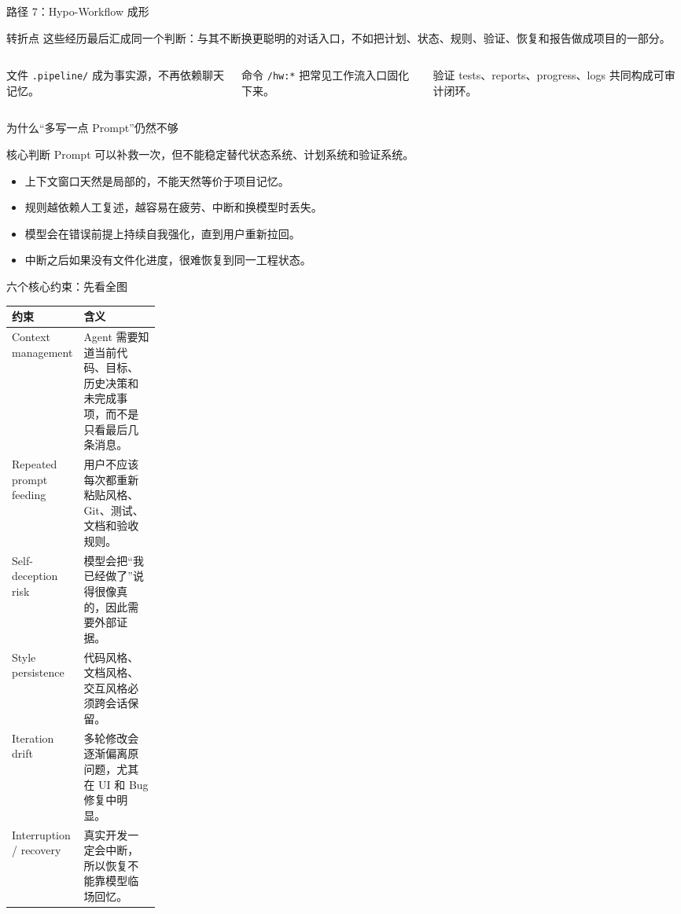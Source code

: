\documentclass[theme=workflow,aspectratio=169,fontset=tech]{Hypo-Slide}
\begin{document}
\begin{frame}{路径 7：Hypo-Workflow 成形}
  \begin{block}{转折点}
    这些经历最后汇成同一个判断：与其不断换更聪明的对话入口，不如把计划、状态、规则、验证、恢复和报告做成项目的一部分。
  \end{block}
  \begin{columns}[T,totalwidth=\textwidth]
    \begin{block}{文件}
      \texttt{.pipeline/} 成为事实源，不再依赖聊天记忆。
    \end{block}
    \begin{block}{命令}
      \texttt{/hw:*} 把常见工作流入口固化下来。
    \end{block}
    \begin{block}{验证}
      tests、reports、progress、logs 共同构成可审计闭环。
    \end{block}
  \end{columns}
\end{frame}

\begin{frame}{为什么“多写一点 Prompt”仍然不够}
  \begin{block}{核心判断}
    Prompt 可以补救一次，但不能稳定替代状态系统、计划系统和验证系统。
  \end{block}
  \begin{itemize}
    \item 上下文窗口天然是局部的，不能天然等价于项目记忆。
    \item 规则越依赖人工复述，越容易在疲劳、中断和换模型时丢失。
    \item 模型会在错误前提上持续自我强化，直到用户重新拉回。
    \item 中断之后如果没有文件化进度，很难恢复到同一工程状态。
  \end{itemize}
\end{frame}

\begin{frame}{六个核心约束：先看全图}
  \small
  \begin{tabularx}{\textwidth}{p{0.22\linewidth}X}
    \toprule
    约束 & 含义 \\
    \midrule
    Context management & Agent 需要知道当前代码、目标、历史决策和未完成事项，而不是只看最后几条消息。 \\
    Repeated prompt feeding & 用户不应该每次都重新粘贴风格、Git、测试、文档和验收规则。 \\
    Self-deception risk & 模型会把“我已经做了”说得很像真的，因此需要外部证据。 \\
    Style persistence & 代码风格、文档风格、交互风格必须跨会话保留。 \\
    Iteration drift & 多轮修改会逐渐偏离原问题，尤其在 UI 和 Bug 修复中明显。 \\
    Interruption / recovery & 真实开发一定会中断，所以恢复不能靠模型临场回忆。 \\
    \bottomrule
  \end{tabularx}
\end{frame}
\end{document}
